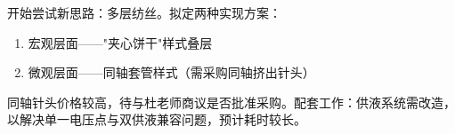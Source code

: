 开始尝试新思路：多层纺丝。拟定两种实现方案：
\begin{enumerate}
  \item 宏观层面——"夹心饼干"样式叠层
  \item 微观层面——同轴套管样式（需采购同轴挤出针头）
\end{enumerate}
同轴针头价格较高，待与杜老师商议是否批准采购。配套工作：供液系统需改造，以解决单一电压点与双供液兼容问题，预计耗时较长。
